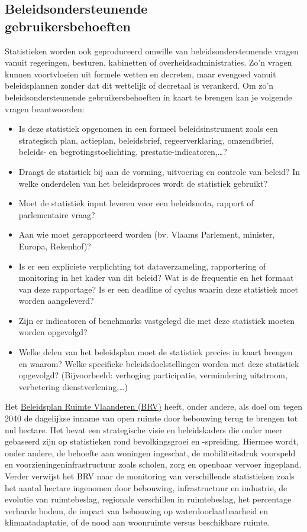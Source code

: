 \documentclass[\mainfiledir/00_handleiding_statistiekproductie.tex]{subfiles}
\begin{document}
\subsection[Beleidsondersteunende gebruikersbehoeften]{Beleidsondersteunende\\gebruikersbehoeften}

Statistieken worden ook geproduceerd omwille van beleidsondersteunende vragen vanuit regeringen, besturen, kabinetten of overheidsadministraties. Zo'n vragen kunnen voortvloeien uit formele wetten en decreten, maar evengoed vanuit beleidsplannen zonder dat dit wettelijk of decretaal is verankerd. Om zo'n beleidsondersteunende gebruikersbehoeften in kaart te brengen kan je volgende vragen beantwoorden:
\begin{itemize}[nosep]
    \item Is deze statistiek opgenomen in een formeel beleidsinstrument zoals een strategisch plan, actieplan, beleidsbrief, regeerverklaring, omzendbrief, beleids- en begrotingstoelichting, prestatie-indicatoren,\ldots? 
    \item Draagt de statistiek bij aan de vorming, uitvoering en controle van beleid? In welke onderdelen van het beleidsproces wordt de statistiek gebruikt?
    \item Moet de statistiek input leveren voor een beleidsnota, rapport of parlementaire vraag?
    \item Aan wie moet gerapporteerd worden (bv. Vlaams Parlement, minister, Europa, Rekenhof)? 
    \item Is er een expliciete verplichting tot dataverzameling, rapportering of monitoring in het kader van dit beleid? Wat is de frequentie en het formaat van deze rapportage? Is er een deadline of cyclus waarin deze statistiek moet worden aangeleverd?
    \item Zijn er indicatoren of benchmarks vastgelegd die met deze statistiek moeten worden opgevolgd?
    \item Welke delen van het beleidsplan moet de statistiek precies in kaart brengen en waarom? Welke specifieke beleidsdoelstellingen worden met deze statistiek opgevolgd? (Bijvoorbeeld: verhoging participatie, vermindering uitstroom, verbetering dienstverlening,\ldots)
\end{itemize}

Het \href{https://omgeving.vlaanderen.be/nl/BRV}{Beleidsplan Ruimte Vlaanderen (BRV)} heeft, onder andere, als doel om tegen 2040 de dagelijkse inname van open ruimte door bebouwing terug te brengen tot nul hectare. Het bevat een strategische visie en beleidskaders die onder meer gebaseerd zijn op statistieken rond bevolkingsgroei en -spreiding. Hiermee wordt, onder andere, de behoefte aan woningen ingeschat, de mobiliteitsdruk voorspeld en voorzieningeninfrastructuur zoals scholen, zorg en openbaar vervoer ingepland. Verder verwijst het BRV naar de monitoring van verschillende statistieken zoals het aantal hectare ingenomen door bebouwing, infrastructuur en industrie, de evolutie van ruimtebeslag, regionale verschillen in ruimtebeslag, het percentage verharde bodem, de impact van bebouwing op waterdoorlaatbaarheid en klimaatadaptatie, of de nood aan woonruimte versus beschikbare ruimte.
\end{document}
